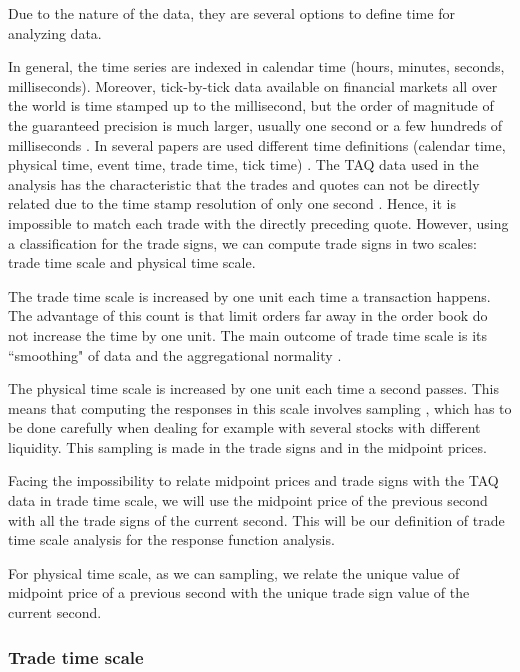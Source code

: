 Due to the nature of the data, they are several options to define time for
analyzing data.

In general, the time series are indexed in calendar time (hours, minutes,
seconds, milliseconds). Moreover, tick-by-tick data available on financial
markets all over the world is time stamped up to the millisecond, but the order
of magnitude of the guaranteed precision is much larger, usually one second or
a few hundreds of milliseconds \cite{market_digest,empirical_facts}. In several
papers are used different time definitions (calendar time, physical time, event
time, trade time, tick time)
\cite{empirical_facts,sampling_returns,market_making}. The TAQ data used in the
analysis has the characteristic that the trades and quotes can not be directly
related due to the time stamp resolution of only one second
\cite{Wang_2016_cross}. Hence, it is impossible to match each trade with the
directly preceding quote. However, using a classification for the trade signs,
we can compute trade signs in two scales: trade time scale and physical time
scale.

The trade time scale is increased by one unit each time a transaction happens.
The advantage of this count is that limit orders far away in the order book do
not increase the time by one unit. The main outcome of trade time scale is its
``smoothing" of data and the aggregational normality \cite{empirical_facts}.

The physical time scale is increased by one unit each time a second passes.
This means that computing the responses in this scale involves sampling
\cite{sampling_returns,Wang_2016_cross}, which has to be done carefully when
dealing for example with several stocks with different liquidity. This sampling
is made in the trade signs and in the midpoint prices.

Facing the impossibility to relate midpoint prices and trade signs with the TAQ
data in trade time scale, we will use the midpoint price of the previous second
with all the trade signs of the current second. This will be our definition of
trade time scale analysis for the response function analysis.

For physical time scale, as we can sampling, we relate the unique value of
midpoint price of a previous second with the unique trade sign value of the
current second.

\subsubsection*{Trade time scale}\label{subsubsec:trade_time}

